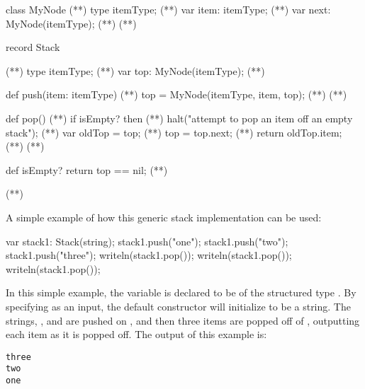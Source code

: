 \begin{numberedchapel}
class MyNode {                      (*\label{mynode_class_start}*)
  type itemType;                    (*\label{mynode_itemtype}*)
  var item: itemType;               (*\label{mynode_item}*)
  var next: MyNode(itemType);       (*\label{mynode_next}*)
}                                   (*\label{mynode_class_end}*)

record Stack {                      (*\label{stack_list_start}*)
  type itemType;                    (*\label{stack_list_itemtype}*)
  var top: MyNode(itemType);        (*\label{stack_list_top}*)

  def push(item: itemType) {        (*\label{stack_list_push_start}*)
    top = MyNode(itemType, item, top); (*\label{stack_list_push_top}*)
  }                                 (*\label{stack_list_push_end}*)

  def pop() {                       (*\label{stack_list_pop_start}*)
    if isEmpty? then                (*\label{stack_list_pop_empty_1}*)
      halt("attempt to pop an item off an empty stack"); (*\label{stack_list_empty_2}*)
    var oldTop = top;               (*\label{stack_list_pop_oldtop}*)
    top = top.next;                 (*\label{stack_list_pop_newtop}*)
    return oldTop.item;             (*\label{stack_list_pop_return}*)
  }                                 (*\label{stack_list_pop_end}*)

  def isEmpty? return top == nil;   (*\label{stack_list_isempty}*)
}                                  (*\label{stack_list_end}*)
\end{numberedchapel}

A simple example of how this generic stack implementation can be used:
\begin{chapel}
var stack1: Stack(string);
stack1.push("one");
stack1.push("two");
stack1.push("three");
writeln(stack1.pop());
writeln(stack1.pop());
writeln(stack1.pop());
\end{chapel}
In this simple example, the variable  is declared to be of the structured 
type .  By specifying  as an input, the default constructor
will initialize  to be a string.  
The strings, ,  and 
are pushed on , and then three items are popped off of ,
outputting each item as it is popped off. The output of this example is:
{\small
\begin{verbatim}
three
two
one
\end{verbatim}}

